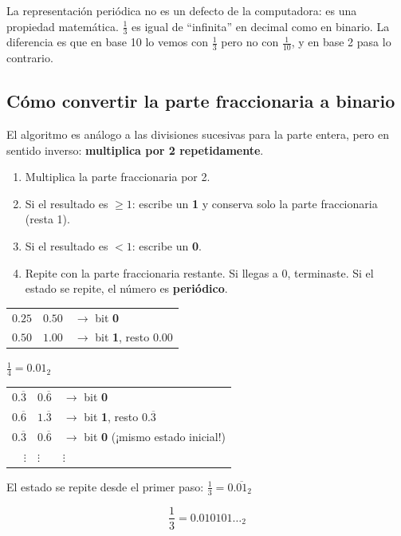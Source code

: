 \documentclass[12pt, oneside]{article}
\begin{document}
\begin{recuerda}
  La representación periódica no es un defecto de la computadora:
  es una propiedad matemática. $\frac{1}{3}$ es igual de
  ``infinita'' en decimal como en binario. La diferencia es que en base 10
  lo vemos con $\frac{1}{3}$ pero no con $\frac{1}{10}$, y en base 2
  pasa lo contrario.
\end{recuerda}

\subsection{Cómo convertir la parte fraccionaria a binario}

El algoritmo es análogo a las divisiones sucesivas para la parte entera,
pero en sentido inverso: \textbf{multiplica por 2 repetidamente}.

\begin{enumerate}
  \item Multiplica la parte fraccionaria por 2.
  \item Si el resultado es $\geq 1$: escribe un \textbf{1} y conserva
        solo la parte fraccionaria (resta 1).
  \item Si el resultado es $< 1$: escribe un \textbf{0}.
  \item Repite con la parte fraccionaria restante.
        Si llegas a 0, terminaste. Si el estado se repite, el número
        es \textbf{periódico}.
\end{enumerate}

\begin{ejemplo}[Convertir $\frac{1}{4} = 0.25$ a binario]
\begin{center}
\begin{tabular}{r@{\ $\times 2=$\ }ll}
  $0.25$ & $0.50$ & $\to$ bit \textbf{0} \\
  $0.50$ & $1.00$ & $\to$ bit \textbf{1}, resto $0.00$ \\
\end{tabular}
\end{center}
$\frac{1}{4} = 0.01_2$ \checkmark
\end{ejemplo}

\begin{ejemplo}
\begin{center}
\begin{tabular}{r@{\ $\times 2=$\ }ll}
  $0.\overline{3}$ & $0.\overline{6}$ & $\to$ bit \textbf{0} \\
  $0.\overline{6}$ & $1.\overline{3}$ & $\to$ bit \textbf{1}, resto $0.\overline{3}$ \\
  $0.\overline{3}$ & $0.\overline{6}$ & $\to$ bit \textbf{0} \quad (¡mismo estado inicial!) \\
  $\vdots$ & $\vdots$ & $\vdots$ \\
\end{tabular}
\end{center}
El estado se repite desde el primer paso: $\frac{1}{3} = 0.\overline{01}_2$

\[
  \frac{1}{3} = 0.010101\ldots_2
\]
\end{ejemplo}
\end{document}
